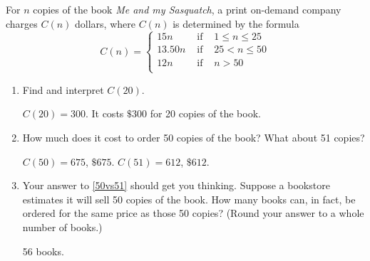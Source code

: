 \documentclass{ximera}
\begin{document}
\begin{problem}\label{piecewiseordering}
For $n$ copies of the book \textit{Me and my Sasquatch}, a print on-demand company charges $C(n)$ dollars, where $C(n)$ is determined by the formula 
\[
C(n) = \left\{ \begin{array}{rcl}  15n & \mbox{ if } & 1 \leq n \leq 25  \\
13.50n  & \mbox{ if } & 25 < n \leq 50 \\
12n & \mbox{ if } & n > 50 \\
\end{array} \right.
\]

\begin{enumerate}

\item  Find and interpret $C(20)$.

\begin{solution}
$C(20) = 300$.  It costs $\$300$ for 20 copies of the book.
\end{solution}

\item  \label{50vs51} How much does it cost to order 50 copies of the book?  What about 51 copies?

\begin{solution}
$C(50) = 675$, $\$ 675$.  $C(51) = 612$, $\$ 612$.
\end{solution}

\item  Your answer to \ref{50vs51} should get you thinking. Suppose a bookstore estimates it will sell 50 copies of the book.  How many books can, in fact, be ordered for the same price as those 50 copies? (Round your answer to a  whole number of books.)

\begin{solution}
56 books.
\end{solution}

\end{enumerate}
\end{problem}
\end{document}
